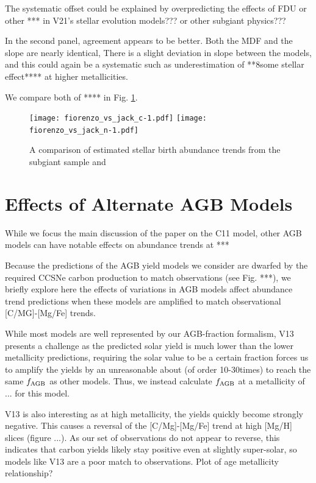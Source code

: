 \documentclass[fleqn,usenatbib]{mnras}
\begin{document}
The systematic offset could be explained by overpredicting the effects of FDU or other *** in V21's stellar evolution models??? or other subgiant physics???

In the second panel, agreement appears to be better. Both the MDF and the slope are nearly identical,
There is a slight deviation in slope between the models, and this could again be a systematic such as underestimation of **8some stellar effect**** at higher metallicities.

We compare both of **** in Fig. \ref{fig:fiorenzo_jack}.


\begin{figure}
    \centering
    \texttt{[image: fiorenzo\_vs\_jack\_c-1.pdf]}
    \texttt{[image: fiorenzo\_vs\_jack\_n-1.pdf]}
    \caption{A comparison of estimated stellar birth abundance trends from the subgiant sample and
        \citet{fiorenzo+21}
    }
    \label{fig:fiorenzo_jack}
\end{figure}



\section{Effects of Alternate AGB Models}\label{sec:alt_agb}


While we focus the main discussion of the paper on the C11 model, other AGB models can have notable effects on abundance trends at ***

Because the predictions of the AGB yield models we consider are dwarfed by the
required CCSNe carbon production to match observations (see Fig. ***), we briefly explore here the effects of variations in AGB models affect abundance trend predictions when these models are amplified to match observational [C/MG]-[Mg/Fe] trends. 

While most models are well represented by our AGB-fraction formalism, V13 presents a challenge as the predicted solar yield is much lower than the lower metallicity predictions, requiring the solar value to be a certain fraction forces us to amplify the yields by an unreasonable about (of order 10-30times) to reach the same $f_{\rm AGB}$ as other models. Thus, we instead calculate $f_{\rm AGB}$ at a metallicity of ... for this model. 

V13 is also interesting as at high metallicity, the yields quickly become strongly negative. This causes a reversal of the [C/Mg]-[Mg/Fe] trend at high [Mg/H] slices (figure ...). As our set of observations do not appear to reverse, this indicates that carbon yields likely stay positive even at slightly super-solar, so models like V13 are a poor match to observations. 
Plot of age metallicity relationship?
\end{document}
